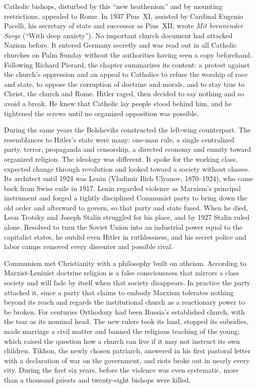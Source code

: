 Catholic bishops, disturbed by this ``new heathenism'' and by mounting restrictions, appealed to
Rome. In 1937 Pius~XI, assisted by Cardinal Eugenio Pacelli, his secretary of state and successor as
Pius~XII, wrote \emph{Mit brennender Sorge} (``With deep anxiety''). No important church document had
attacked Nazism before. It entered Germany secretly and was read out in all Catholic churches on Palm
Sunday without the authorities having seen a copy beforehand. Following Richard Pierard, the chapter
summarizes its content: a protest against the church's oppression and an appeal to Catholics to
refuse the worship of race and state, to oppose the corruption of doctrine and morals, and to stay
true to Christ, the church and Rome. Hitler raged, then decided to say nothing and so avoid a break.
He knew that Catholic lay people stood behind him, and he tightened the screws until no organized
opposition was possible.

During the same years the Bolsheviks constructed the left-wing counterpart. The resemblances to
Hitler's state were many: one-man rule, a single centralized party, terror, propaganda and
censorship, a directed economy and enmity toward organized religion. The ideology was different. It
spoke for the working class, expected change through revolution and looked toward a society without
classes. Its architect until 1924 was Lenin (Vladimir Ilich Ulyanov, 1870--1924), who came back from
Swiss exile in 1917. Lenin regarded violence as Marxism's principal instrument and forged a tightly
disciplined Communist party to bring down the old order and afterward to govern, so that party and
state fused. When he died, Leon Trotsky and Joseph Stalin struggled for his place, and by 1927 Stalin
ruled alone. Resolved to turn the Soviet Union into an industrial power equal to the capitalist
states, he outdid even Hitler in ruthlessness, and his secret police and labor camps removed every
dissenter and possible rival.

Communism met Christianity with a philosophy built on atheism. According to Marxist-Leninist
doctrine religion is a false consciousness that mirrors a class society and will fade by itself when
that society disappears. In practice the party attacked it, since a party that claims to embody
Marxism tolerates nothing beyond its reach and regards the institutional church as a reactionary
power to be broken. For centuries Orthodoxy had been Russia's established church, with the tsar as its nominal head. The new rulers took its land, stopped its subsidies, made marriage a civil matter
and banned the religious teaching of the young, which raised the question how a church can live if it
may not instruct its own children. Tikhon, the newly chosen patriarch, answered in his first pastoral
letter with a declaration of war on the government, and riots broke out in nearly every city. During
the first six years, before the violence was even systematic, more than a thousand priests and
twenty-eight bishops were killed.

